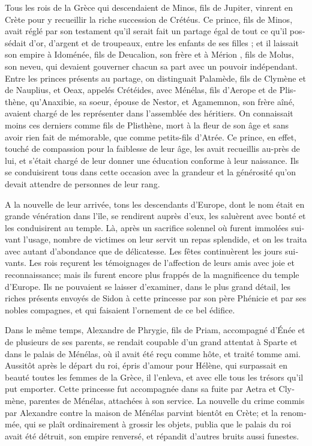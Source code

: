 \documentclass{article}
\begin{document}
\maxhXnotes{0.25\textheight}
\begin{pages}

\begin{Leftside}
\begin{french}
\beginnumbering
\autopar

Tous les rois de la Grèce qui descendaient de Minos, fils de Jupiter, vinrent en Crète pour y recueillir la riche succession de Crétéus. Ce prince, fils de Minos, avait réglé par son testament qu'il serait fait un partage égal de tout ce qu'il possédait d'or, d'argent et de troupeaux, entre les enfants de ses filles ; et il laissait son empire à Idoménée, fils de Deucalion, son frère et à Mérion , fils de Molus, son neveu, qui devaient gouverner chacun sa part avec un pouvoir indépendant. Entre les princes présents au partage, on distinguait Palamède, fils de Clymène et de Nauplius, et Oeax, appelés Crétéides, avec Ménélas, fils d'Aerope et de Plisthène, qu'Anaxibie, sa soeur, épouse de Nestor, et Agamemnon, son frère aîné, avaient chargé de les représenter dans l'assemblée des héritiers. On connaissait moins ces derniers comme fils de Plisthène, mort à la fleur de son âge et sans avoir rien fait de mémorable, que comme petits-fils d'Atrée. Ce prince, en effet, touché de compassion pour la faiblesse de leur âge, les avait recueillis au-près de lui, et s'était chargé de leur donner une éducation conforme à leur naissance. Ils se conduisirent tous dans cette occasion avec la grandeur et la générosité qu'on devait attendre de personnes de leur rang.

A la nouvelle de leur arrivée, tons les descendants d'Europe, dont le nom était en grande vénération dans l'île, se rendirent auprès d'eux, les saluèrent avec bonté et les conduisirent au temple. Là, après un sacrifice solennel où furent immolées suivant l'usage, nombre de victimes on leur servit un repas splendide, et on les traita avec autant d'abondance que de délicatesse. Les fêtes continuèrent les jours suivants. Les rois reçurent les témoignages de l'affection de leurs amis avec joie et reconnaissance; mais ils furent encore plus frappés de la magnificence du temple d'Europe. Ils ne pouvaient se laisser d'examiner, dans le plus grand détail, les riches présents envoyés de Sidon à cette princesse par son père Phénicie  et par ses nobles compagnes, et qui faisaient l'ornement de ce bel édifice.

Dans le même temps, Alexandre de Phrygie, fils de Priam, accompagné d'Énée  et de plusieurs de ses parents, se rendait coupable d'un grand attentat à Sparte et dans le palais de Ménélas, où il avait été reçu comme hôte, et traité tomme ami. Aussitôt après le départ du roi, épris d'amour pour Hélène, qui surpassait en beauté toutes les femmes de la Grèce, il l'enleva, et avec elle tous les trésors qu'il put emporter. Cette princesse fut accompagnée dans sa fuite par Aetra et Clymène, parentes de Ménélas, attachées à son service. La nouvelle du crime commis par Alexandre contre la maison de Ménélas parvint bientôt en Crète; et la renommée, qui se plaît ordinairement à grossir les objets, publia que le palais du roi avait été détruit, son empire renversé, et répandit d'autres bruits aussi funestes.


\end{french}
\end{Leftside}
\end{pages}
\end{document}
